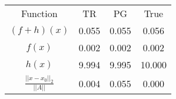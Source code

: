 \begin{tabular}{| c |c |c |c |}
    \hline
    \rowcolor[gray]{0.9}
\multicolumn{4}{|c|}{Minima} \\ \hline Function & TR & PG & True \\
    \hline
  \rowcolor[gray]{0.7}
    $ (f + h)(x) $ & 0.055 & 0.055 & 0.056 \\
  \hline
  \rowcolor[gray]{0.8}
    $ f(x) $ & 0.002 & 0.002 & 0.002 \\
  \hline
  \rowcolor[gray]{0.7}
    $ h(x) $ & 9.994 & 9.995 & 10.000 \\
  \hline
  \rowcolor[gray]{0.8}
    $ \frac{||x - x_0||_2}{||A||} $ & 0.004 & 0.055 & 0.000 \\
  \hline
\end{tabular}
